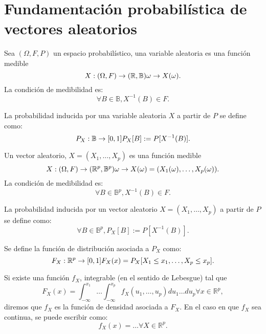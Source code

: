 \section{Fundamentación probabilística de vectores aleatorios}

\begin{ndef}
    Sea $(\Omega, F, P)$ un espacio probabilístico, una variable aleatoria es una función medible
    \[
    X:(\Omega, F) \rightarrow (\mathbb{R}, \mathbb{B}) \\
    \omega \rightarrow X(\omega)
    .\]
    La condición de medibilidad es:
    \[
    \forall B \in \mathbb{B}, X^{-1}(B) \in F
    .\]
\end{ndef}

\begin{ndef}
    La probabilidad inducida por una variable aleatoria $X$ a partir de $P$ se define como:
    \[
    P_{X}:\mathbb{B} \rightarrow [0,1] \\
    P_{X}[B]:= P[X^{-1}(B)]
    .\]
\end{ndef}

\begin{ndef}
    Un vector aleatorio, $X = (X_1, \dots, X_p)$ es una función medible
    \[
    X:(\Omega, F) \rightarrow (\mathbb{R}^p, \mathbb{B}^p) \\
    \omega \rightarrow X(\omega) = (X_1(\omega), \dots, X_p(\omega))
    .\]
    La condición de medibilidad es:
    \[
    \forall B \in \mathbb{B}^p, X^{-1}(B) \in F
    .\]
\end{ndef}

\begin{ndef}
    La probabilidad inducida por un vector aleatorio $X = (X_1, \dots, X_p)$ a partir de $P$ se define como:
    \[
    \forall B \in \mathbb{B}^p, P_X[B] := P[X^{-1}(B)]
    .\]
\end{ndef}

\begin{ndef}
    Se define la función de distribución asociada a $P_X$ como:
    \[
    F_X:\mathbb{R}^p \rightarrow [0,1] \\
    F_X(x) = P_X[X_1 \leq x_1, \dots, X_p \leq x_p]
    .\]
\end{ndef}

\begin{ndef}
    Si existe una función $f_X$, integrable (en el sentido de Lebesgue) tal que
    \[
    F_X(x) = \int^{x_1}_{-\infty} \dots \int^{x_p}_{-\infty} f_X(u_1, \dots,  u_p) du_1 \dots du_p \forall x \in \mathbb{R}^p
    ,\]
    diremos que $f_X$ es la función de densidad asociada a  $F_X$. En el caso en que $f_X$ sea continua, se puede escribir como:
    \[
    f_X(x) = \dots \forall X \in \mathbb{R}^p
    .\]
\end{ndef}

